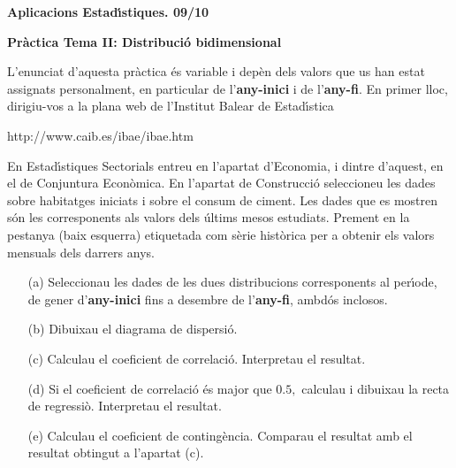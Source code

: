 \documentclass[11pt]{article}
\begin{document}
\begin{center}
\textbf{{\large{Aplicacions Estad\'{\i}stiques.  09/10}}}

\vspace{0.5cm}

\textbf{Pr\`actica Tema II: Distribuci\'o bidimensional}
\end{center} 

L'enunciat d'aquesta pr\`actica \'es variable i dep\`en dels valors que us han estat assignats personalment, en particular de l'\textbf{any-inici} i de l'\textbf{any-fi}. En primer lloc, dirigiu-vos a la plana web de l'Institut Balear de Estad\'{\i}stica 
\begin{center}
http://www.caib.es/ibae/ibae.htm
\end{center}
En Estad\'{\i}stiques Sectorials entreu en l'apartat d'Economia, i dintre d'aquest, en el de Conjuntura Econ\`omica. En l'apartat de Construcci\'o seleccioneu les dades sobre habitatges iniciats i sobre el consum de ciment. Les dades que es mostren s\'on les corresponents als valors dels \'ultims mesos estudiats. Prement en la pestanya (baix esquerra) etiquetada com s\`erie hist\`orica per a obtenir  els valors mensuals dels darrers anys.

\begin{itemize}
\item [(a)] Seleccionau les dades de les dues distribucions corresponents al per\'{\i}ode, de gener d'\textbf{any-inici} fins a desembre de l'\textbf{any-fi}, ambd\'os inclosos.
\item [(b)] Dibuixau el diagrama de dispersi\'o.
\item [(c)] Calculau el coeficient de correlaci\'o. Interpretau el resultat.
\item [(d)] Si el coeficient de correlaci\'o \'es major que $0.5,$ calculau i dibuixau la recta de regressi\`o. Interpretau el resultat.
\item [(e)] Calculau el coeficient de conting\`encia. Comparau el resultat amb el resultat obtingut a l'apartat (c).
\end{itemize}
\end{document}
